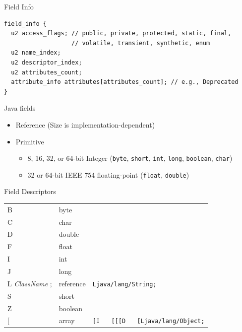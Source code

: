 \documentclass[
14pt,
aspectratio=169,
usenames,
dvipsnames,
x11names]{beamer}
\begin{document}
\begin{frame}[fragile]{Field Info}
\begin{lstlisting}
field_info {
  u2 access_flags; // public, private, protected, static, final,
                   // volatile, transient, synthetic, enum
  u2 name_index;
  u2 descriptor_index;
  u2 attributes_count;
  attribute_info attributes[attributes_count]; // e.g., Deprecated
}
\end{lstlisting}
\end{frame}

\begin{frame}{Java fields}
  \begin{itemize}  \setlength{\itemsep}{\fill}
  \item Reference (Size is implementation-dependent)
  \item Primitive
    \begin{itemize}
    \item 8, 16, 32, or 64-bit Integer (\texttt{byte}, \texttt{short}, \texttt{int}, \texttt{long}, \texttt{boolean}, \texttt{char})
    \item 32 or 64-bit IEEE 754 floating-point (\texttt{float}, \texttt{double})
    \end{itemize}
  \end{itemize}
\end{frame}

\begin{frame}{Field Descriptors}
  \begin{tabular}{l | l | l}
    B                      & byte      &                                                               \\
    C                      & char      &                                                               \\
    D                      & double    &                                                               \\
    F                      & float     &                                                               \\
    I                      & int       &                                                               \\
    J                      & long      &                                                               \\
    L \textit{ClassName} ; & reference & \texttt{Ljava/lang/String;}                                   \\
    S                      & short     &                                                               \\
    Z                      & boolean   &                                                               \\\relax
    [                      & array     & \texttt{[I} ~~ \texttt{[[[D} ~~  \texttt{[Ljava/lang/Object;} \\
  \end{tabular}
\end{frame}
\end{document}
